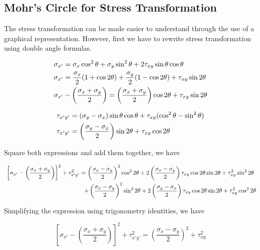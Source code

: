 \documentclass[a4paper,openany,12pt]{book}
\begin{document}
\subsection{Mohr's Circle for Stress Transformation}
\label{mohrs-circle-for-stress-transformation}
The stress transformation can be made easier to understand through the
use of a graphical representation. However, first we have to rewrite
stress transformation using double angle formulas.

$$\begin{gathered}
  \sigma_{x'} = \sigma_x\cos^2\theta  + \sigma_y\sin^2\theta  + 2\tau_{xy}\sin \theta \cos \theta  \hfill \\
  \sigma _{x'} = \frac{\sigma_x}{2}(1 + \cos 2\theta ) + \frac{\sigma_y}{2}(1 - \cos 2\theta ) + {\tau_{xy}}\sin 2\theta  \hfill \\
  \sigma_{x'} - \left( \frac{\sigma_x + \sigma_y}{2} \right) = \left( \frac{\sigma_x + \sigma_y}{2} \right)\cos 2\theta  + {\tau_{xy}}\sin 2\theta  \hfill \\ 
\end{gathered}$$

$$\begin{gathered}
  \tau_{x'y'} = (\sigma_y - \sigma_x)\sin \theta \cos \theta  + \tau_{xy}(\cos^2\theta  - \sin^2\theta ) \\
  \tau_{x'y'} = \left( \frac{\sigma_y - \sigma_x}{2} \right)\sin 2\theta  + \tau _{xy}\cos 2\theta \hfill \\ 
\end{gathered}$$

Square both expressions and add them together, we have

$$\begin{gathered}
    \left[ \sigma_{x'} - \left( \frac{\sigma_x + \sigma_y}{2} \right) \right]^2 + \tau_{x'y'}^2 = \left( \frac{\sigma_x - \sigma_y}{2} \right)^2\cos^2 2\theta  + 2\left( \frac{\sigma_x - \sigma_y}{2} \right)\tau_{xy}\cos 2\theta \sin 2\theta  + \tau_{xy}^2\sin^2 2\theta \\
    \hspace{4.7cm} + \left( \frac{\sigma_x - \sigma_y}{2} \right)^2 \sin^2 2\theta  + 2\left( \frac{\sigma_y - \sigma_x}{2} \right)\tau_{xy}\cos 2\theta \sin 2\theta  + \tau_{xy}^2\cos^2 2\theta \\ 
\end{gathered}$$

Simplifying the expression using trigonometry identities, we have

$$\left[ \sigma_{x'} - \left( \frac{\sigma_x + \sigma_y}{2} \right) \right]^2 + \tau_{x'y'}^2 = \left( \frac{\sigma_x - \sigma_y}{2} \right)^2 + \tau_{xy}^2$$
\end{document}
